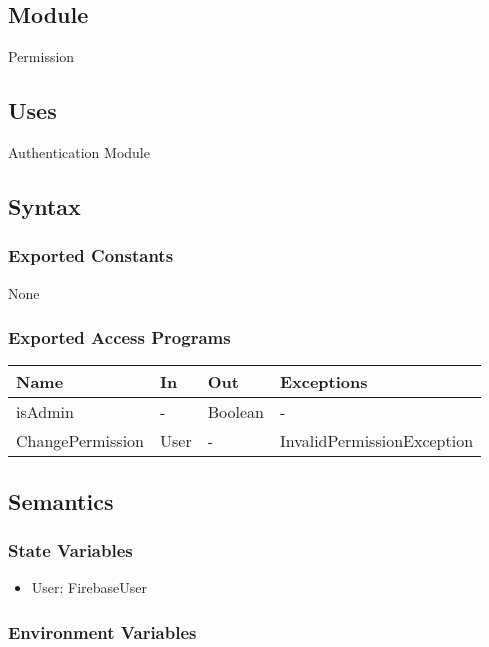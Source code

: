 \documentclass[12pt, titlepage]{article}
\begin{document}
\subsection{Module}

Permission

\subsection{Uses}

Authentication Module

\subsection{Syntax}

\subsubsection{Exported Constants}

None

\subsubsection{Exported Access Programs}

\begin{center}
	\begin{tabular}{p{4cm} p{2cm} p{4cm} p{4cm}}
	\hline
	\textbf{Name} & \textbf{In} & \textbf{Out} & \textbf{Exceptions} \\
	\hline
	isAdmin & - & Boolean & - \\
	ChangePermission & User & - & InvalidPermissionException \\
	\hline
	\end{tabular}
\end{center}

\subsection{Semantics}

\subsubsection{State Variables}

\begin{itemize}
\item User: FirebaseUser
\end{itemize}

\subsubsection{Environment Variables}
\end{document}

